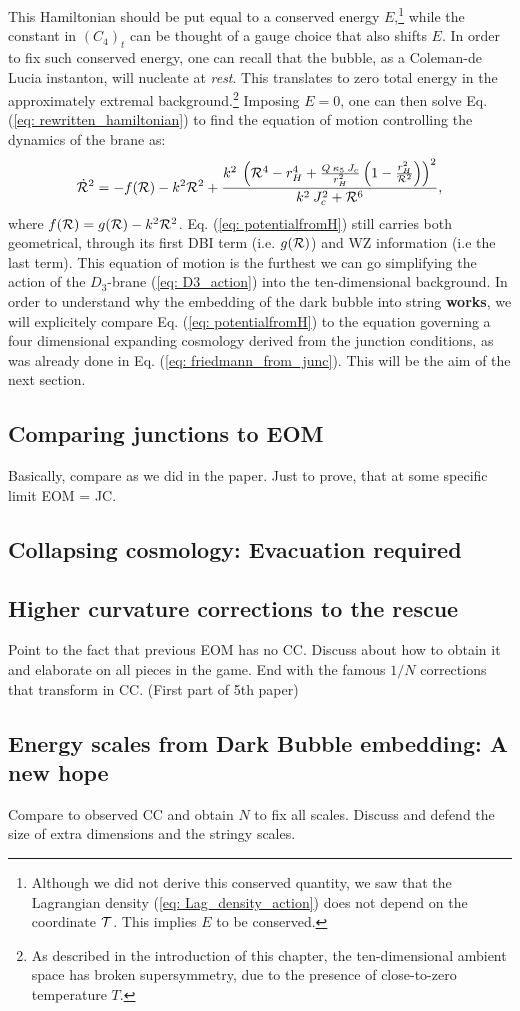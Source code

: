 This Hamiltonian should be put equal to a conserved energy $E$,\footnote{Although we did not derive this conserved quantity, we saw that the Lagrangian density (\ref{eq: Lag_density_action}) does not depend on the coordinate $\mathcal{T}$. This implies $E$ to be conserved.} while the constant in $(C_4)_t$ can be thought of a gauge choice that also shifts $E$. In order to fix such conserved energy, one can recall that the bubble, as a Coleman-de Lucia instanton, will nucleate at \textit{rest}. This translates to zero total energy in the approximately extremal background.\footnote{As described in the introduction of this chapter, the ten-dimensional ambient space has broken supersymmetry, due to the presence of close-to-zero temperature $T$.} Imposing $E=0$, one can then solve Eq. (\ref{eq: rewritten_hamiltonian}) to find the equation of motion controlling the dynamics of the brane as:
\begin{equation}\label{eq: potentialfromH}
    \dot{\mathcal{R}}^{2} = -f(\mathcal{R}) -k^2 \mathcal{R}^2 +  \frac{k^{2}\:\left(\mathcal{R}^{4}-r^{4}_{H}+\frac{Q \: \kappa_{5}\:J_{c}}{r_{H}^{2}}\left(1-\frac{r_{H}^2}{\mathcal{R}^2}\right)\right)^2}{k^{2}\:J_{c}^{2}+\mathcal{R}^{6}},
 \end{equation}
 where $f(\mathcal{R}) = g(\mathcal{R}) - k^{2} \mathcal{R}^{2}$. Eq. (\ref{eq: potentialfromH}) still carries both geometrical, through its first DBI term (i.e. $g(\mathcal{R})$) and WZ information (i.e the last term). This equation of motion is the furthest we can go simplifying the action of the $D_{3}$-brane (\ref{eq: D3_action}) into the ten-dimensional background. In order to understand why the embedding of the dark bubble into string \textbf{works}, we will explicitely compare Eq. (\ref{eq: potentialfromH}) to the equation governing a four dimensional expanding cosmology derived from the junction conditions, as was already done in Eq. (\ref{eq: friedmann_from_junc}).  This will be the aim of the next section.

\subsection{Comparing junctions to EOM}
Basically, compare as we did in the paper. Just to prove, that at some specific limit EOM = JC.
\subsection{Collapsing cosmology: Evacuation required} 
\subsection{Higher curvature corrections to the rescue}
Point to the fact that previous EOM has no CC. Discuss about how to obtain it and elaborate on all pieces in the game. End with the famous $1/N$ corrections that transform in CC. (First part of 5th paper)
\subsection{Energy scales from Dark Bubble embedding: A new hope}\label{subsec: energy_scale}
Compare to observed CC and obtain $N$ to fix all scales. Discuss and defend the size of extra dimensions and the stringy scales.